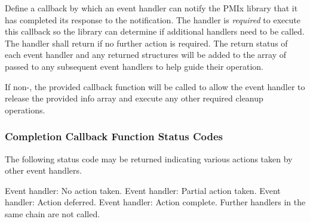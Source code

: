 \descr

Define a callback by which an event handler can notify the \ac{PMIx} library that it has completed its response to the notification. The handler is \textit{required} to execute this callback so the library can determine if additional handlers need to be called. The handler shall return  if no further action is required. The return status of each event handler and any returned  structures will be added to the  array of  passed to any subsequent event handlers to help guide their operation.

If non-, the provided callback function will be called to allow the event handler to release the provided info array and execute any other required cleanup operations.

\subsubsection{Completion Callback Function Status Codes}

The following status code may be returned indicating various actions taken by other event handlers.

\begin{constantdesc}
%
Event handler: No action taken.
%
Event handler: Partial action taken.
%
Event handler: Action deferred.
%
Event handler: Action complete. Further handlers in the same chain are not called.
%
\end{constantdesc}

